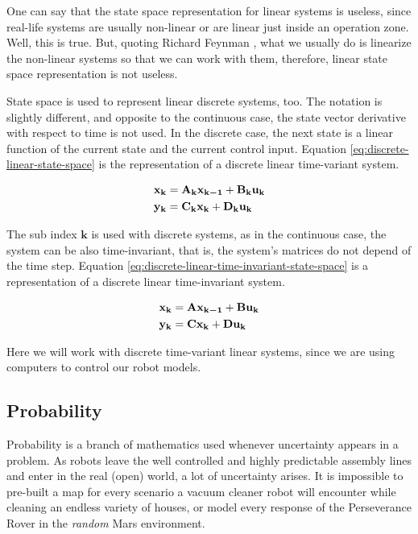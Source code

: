 \documentclass[12pt]{article}
\begin{document}
One can say that the state space representation for linear systems is useless, since real-life systems are usually non-linear or are linear just inside an operation zone. Well, this is true. But, quoting Richard Feynman , what we usually do is linearize the non-linear systems so that we can work with them, therefore, linear state space representation is not useless.

State space is used to represent linear discrete systems, too. The notation is slightly different, and opposite to the continuous case, the state vector derivative with respect to time is not used. In the discrete case, the next state is a linear function of the current state and the current control input. Equation \ref{eq:discrete-linear-state-space} is the representation of a discrete linear time-variant system.

\begin{equation}
    \begin{aligned}
        \boldsymbol{\mathbf{x_{k}}} &= \boldsymbol{\mathbf{A_k}} \boldsymbol{\mathbf{x_{k-1}}} + \boldsymbol{\mathbf{B_k}} \boldsymbol{\mathbf{u_k}} \\
        \boldsymbol{\mathbf{y_k}} &= \boldsymbol{\mathbf{C_k}} \boldsymbol{\mathbf{x_k}} + \boldsymbol{\mathbf{D_k}} \boldsymbol{\mathbf{u_k}}
    \end{aligned}
    \label{eq:discrete-linear-state-space}
\end{equation}

The sub index $\mathbf{k}$ is used with discrete systems, as in the continuous case, the system can be also time-invariant, that is, the system's matrices do not depend of the time step. Equation \ref{eq:discrete-linear-time-invariant-state-space} is a representation of a discrete linear time-invariant system.

\begin{equation}
    \begin{aligned}
        \boldsymbol{\mathbf{x_{k}}} &= \boldsymbol{\mathbf{A}} \boldsymbol{\mathbf{x_{k-1}}} + \boldsymbol{\mathbf{B}} \boldsymbol{\mathbf{u_k}} \\
        \boldsymbol{\mathbf{y_k}} &= \boldsymbol{\mathbf{C}} \boldsymbol{\mathbf{x_k}} + \boldsymbol{\mathbf{D}} \boldsymbol{\mathbf{u_k}}
    \end{aligned}
    \label{eq:discrete-linear-time-invariant-state-space}
\end{equation}

Here we will work with discrete time-variant linear systems, since we are using computers to control our robot models.

\subsection{Probability}
Probability is a branch of mathematics used whenever uncertainty appears in a problem. As robots leave the well controlled and highly predictable assembly lines and enter in the real (open) world, a lot of uncertainty arises. It is impossible to pre-built a map for every scenario a vacuum cleaner robot will encounter while cleaning an endless variety of houses, or model every response of the Perseverance Rover in the \textit{random} Mars environment.
\end{document}

